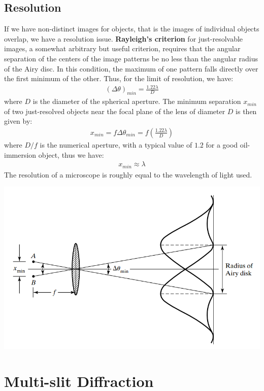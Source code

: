\documentclass[11pt]{book}
\theoremstyle{break}
\theoremstyle{break}
\begin{document}
\subsection{Resolution}
If we have non-distinct images for objects, that is the images of individual objects overlap, we have a resolution issue. \textbf{Rayleigh's criterion} for just-resolvable images, a somewhat arbitrary
but useful criterion, requires that the angular separation of the centers of
the image patterns be no less than the angular radius of the Airy disc. In this condition, the maximum of one pattern falls directly over the first minimum of the other. Thus, for the limit of resolution, we have:
\begin{align*}
(\Delta\theta)_{min} = \frac{1.22 \lambda}{D} 
\end{align*}
where $D$ is the diameter of the spherical aperture. The minimum separation $x_{min}$ of two just-resolved objects near the focal plane of the lens of diameter $D$ is then given by:
\begin{align*}
x_{min} = f\Delta \theta_{min} = f\left( \frac{1.22 \lambda}{D}\right)
\end{align*}
where $D/f$ is the numerical aperture, with a typical value of $1.2$ for a good oil-immersion object, thus we have:
\begin{align*}
x_{min}\approx \lambda
\end{align*}
The resolution of a microscope is roughly equal to the wavelength of light used.
\begin{center}
\includegraphics[scale=0.8]{aiaryDisk}
\end{center}


\newpage
\section[Multi-slit Diffraction]{\color{red} Multi-slit Diffraction\color{black}}
\end{document}
